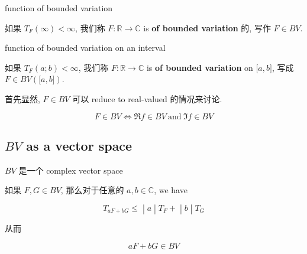 \documentclass{qlnotes-export}
\begin{document}
\begin{definition}{function of bounded variation}\label{def-12-differentiation-on-real-spaces-function-of-bounded-variation}

如果 \(T_{F}(\infty) < \infty\), 我们称 \(F:{\mathbb{R}}\rightarrow{\mathbb{C}}\) is \textbf{of bounded variation} 的, 写作 \(F \in BV\).

\end{definition}

\begin{definition}{function of bounded variation on an interval}\label{def-12-differentiation-on-real-spaces-function-of-bounded-variation-on-an-interval}

如果 \(T_{F}(a;b) < \infty\), 我们称 \(F:{\mathbb{R}}\rightarrow{\mathbb{C}}\) is \textbf{of bounded variation} on \(\lbrack a,b\rbrack\), 写成 \(F \in BV(\lbrack a,b\rbrack)\).

\end{definition}

首先显然, \(F \in BV\) 可以 reduce to real-valued 的情况来讨论.

\begin{proposition}\label{prop-12-differentiation-on-real-spaces-proposition-001}

\[F \in BV\Leftrightarrow\Re f \in BV\ \text{and}\ \Im f \in BV\]

\end{proposition}

\subsection{\texorpdfstring{\(BV\) as a vector space}{BV as a vector space}}\label{bv-as-a-vector-space}

\begin{lemma}{\(BV\) 是一个 complex vector space}\label{lem-12-differentiation-on-real-spaces-bv-complex-vector-space}

如果 \(F,G \in BV\), 那么对于任意的 \(a,b \in {\mathbb{C}}\), we have

\[\left. T_{aF + bG} \leq \middle| a \middle| T_{F} + \middle| b \middle| T_{G} \right.\]

从而

\[aF + bG \in BV\]

\end{lemma}
\end{document}
